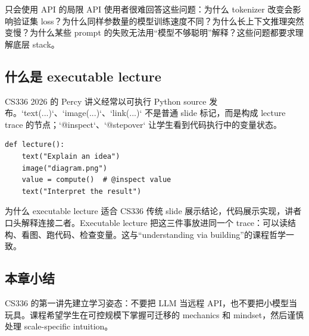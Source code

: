 \begin{warningbox}{只会使用 API 的局限}
API 使用者很难回答这些问题：为什么 tokenizer 改变会影响验证集 loss？为什么同样参数量的模型训练速度不同？为什么长上下文推理突然变慢？为什么某些 prompt 的失败无法用“模型不够聪明”解释？这些问题都要求理解底层 stack。
\end{warningbox}

\subsection{什么是 executable lecture}

CS336 2026 的 Percy 讲义经常以可执行 Python source 发布。`text(...)`、`image(...)`、`link(...)` 不是普通 slide 标记，而是构成 lecture trace 的节点；`@inspect`、`@stepover` 让学生看到代码执行中的变量状态。

\begin{lstlisting}[caption={executable lecture 的最小心智模型}]
def lecture():
    text("Explain an idea")
    image("diagram.png")
    value = compute()  # @inspect value
    text("Interpret the result")
\end{lstlisting}

\begin{knowledgebox}{为什么 executable lecture 适合 CS336}
传统 slide 展示结论，代码展示实现，讲者口头解释连接二者。Executable lecture 把这三件事放进同一个 trace：可以读结构、看图、跑代码、检查变量。这与“understanding via building”的课程哲学一致。
\end{knowledgebox}

\subsection{本章小结}

CS336 的第一讲先建立学习姿态：不要把 LLM 当远程 API，也不要把小模型当玩具。课程希望学生在可控规模下掌握可迁移的 mechanics 和 mindset，然后谨慎处理 scale-specific intuition。

